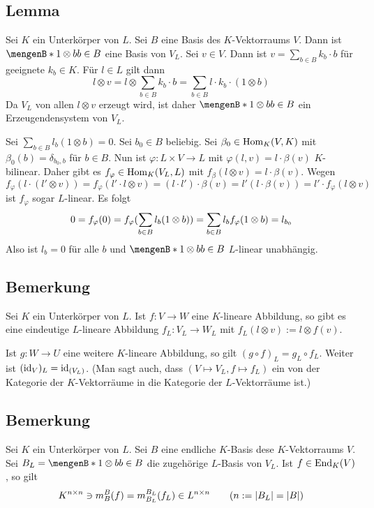 \subsection[Lemma: Basis von $V_L$]{Lemma} %
\label{sub:1011}
Sei $K$ ein Unterkörper von $L$. Sei $B$ eine Basis des $K$-Vektorraums $V$. Dann ist $\set[1 \otimes b]{b \in B}$ eine Basis von $V_L$.
Sei $v \in V$. Dann ist $v= \sum_{b \in B} k_b \cdot b$ für geeignete $k_b \in K$. Für $l \in L$ gilt dann 
\[
	l \otimes v =  l \otimes \sum_{b \in B} k_b \cdot b = \sum_{b \in B} l \cdot k_b \cdot(1 \otimes b)
\]
Da $V_L$ von allen $l \otimes v$ erzeugt wird, ist daher $\set[1 \otimes b]{b \in B}$ ein 
Erzeugendensystem von $V_L$.

Sei $\sum_{b \in B} l_b (1 \otimes b)=0$. Sei $b_0 \in B$ beliebig. Sei $\beta_0 \in \operatorname{Hom}_K(V,K)$ mit $\beta_0 (b) = \delta_{b_0,b}$ für $b \in B$. Nun ist 
$\varphi : L \times V \to L$ mit $\varphi(l,v)= l \cdot \beta(v)$ $K$-bilinear. Daher gibt es $f_\varphi \in \operatorname{Hom}_K (V_L, L)$ mit 
$f_\beta(l \otimes v) = l \cdot \beta(v)$. Wegen 
\[
	f_\varphi ( l \cdot  ( l' \otimes v)) = f_\varphi( l' \cdot l \otimes v) =  (l \cdot l') \cdot  \beta(v) = l'(l \cdot  \beta(v)) =  l' \cdot   f_\varphi( l \otimes v)
\] 
ist $f_\varphi$ sogar $L$-linear. Es folgt
\[
	0 = f_\varphi (0) = f_\varphi ( \sum_{b \in B} l_b (1 \otimes  b)) = \sum_{b \in B} l_b f_\varphi (1 \otimes b) = l_{b_0} 
\]
Also ist $l_b =0$ für alle $b$ und $\set[1 \otimes b]{b \in B} $ $L$-linear unabhängig. \bewende

\subsection[Bemerkung über $L$-lineare Abbildung von $V_L$ nach $W_L$]{Bemerkung} %
\label{sub:1012}
Sei $K$ ein Unterkörper von $L$. Ist $f : V \to W$ eine $K$-lineare Abbildung, so gibt es eine eindeutige $L$-lineare Abbildung $f_L : V_L \to W_L$ mit
$f_L(l \otimes v) := l \otimes f(v)$. 

Ist $g : W \to U$ eine weitere $K$-lineare Abbildung, so gilt $(g \circ f)_L = g_L \circ f_L$. Weiter ist 
$(\operatorname{id}_V)_L= \operatorname{id}_{(V_L)}$. (Man sagt auch, dass $(V \mapsto V_L, f \mapsto f_L)$ ein  von der Kategorie der $K$-Vektorräume in die Kategorie der $L$-Vektorräume ist.)

\subsection[Bemerkung über Matrizen von $f$ und $f_L$]{Bemerkung} %
\label{sub:1013}
Sei $K$ ein Unterkörper von $L$. Sei $B$ eine endliche $K$-Basis dese $K$-Vektorraums $V$. Sei $B_L = \set[1 \otimes b]{b \in B}$ die zugehörige $L$-Basis von $V_L$.
Ist $f \in \operatorname{End}_K(V)$, so gilt 
\[
	 K^{n \times n} \ni m_B^B(f) = m_{B_L}^{B_L}(f_L) \in L^{n \times n} \tag{$n:= \abs{B_L}= \abs{B}$}
\]


